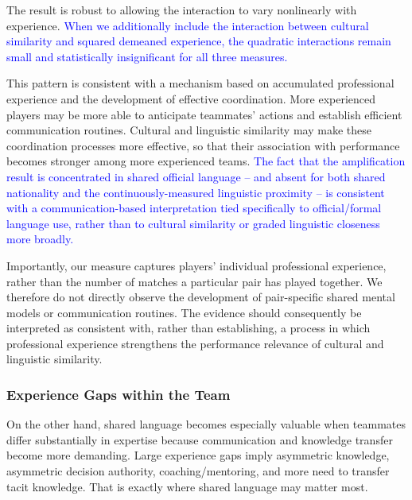 \documentclass[10pt]{article}
\begin{document}
The result is robust to allowing the interaction to vary nonlinearly with experience.
\textcolor{blue}{When we additionally include the interaction between cultural similarity and squared demeaned experience, the quadratic interactions remain small and statistically insignificant for all three measures.}

This pattern is consistent with a mechanism based on accumulated professional experience and the development of effective coordination. More experienced players may be more able to anticipate teammates' actions and establish efficient communication routines. Cultural and linguistic similarity may make these coordination processes more effective, so that their association with performance becomes stronger among more experienced teams. \textcolor{blue}{The fact that the amplification result is concentrated in shared official language -- and absent for both shared nationality and the continuously-measured linguistic proximity -- is consistent with a communication-based interpretation tied specifically to official/formal language use, rather than to cultural similarity or graded linguistic closeness more broadly.}

Importantly, our measure captures players' individual professional experience, rather than the number of matches a particular pair has played together. We therefore do not directly observe the development of pair-specific shared mental models or communication routines. The evidence should consequently be interpreted as consistent with, rather than establishing, a process in which professional experience strengthens the performance relevance of cultural and linguistic similarity.


\subsubsection{Experience Gaps within the Team} 

On the other hand, shared language becomes especially valuable when teammates differ substantially in expertise because communication and knowledge transfer become more demanding. Large experience gaps imply asymmetric knowledge, asymmetric decision authority, coaching/mentoring,
 and more need to transfer tacit knowledge. That is exactly where shared language may matter most. 
\end{document}
